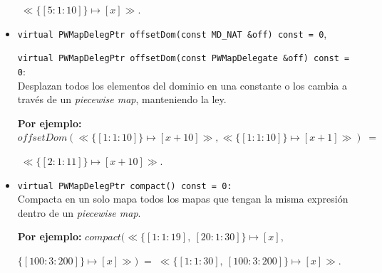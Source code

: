 \begin{itemize}
\begin{center}
        $\;\ll\{[5:1:10]\} \mapsto [x] \gg.$
    \end{center}
        

    \item \texttt{virtual PWMapDelegPtr offsetDom(const MD\_NAT \&off) const = 0}, \par \texttt{virtual PWMapDelegPtr offsetDom(const PWMapDelegate \&off) const = 0}:\\
    Desplazan todos los elementos del dominio en una constante o los cambia a través de un \textit{piecewise map}, manteniendo la ley.

        \begin{center}
        \textbf{Por ejemplo:} $offsetDom(\ll\{[1:1:10]\} \mapsto [x+10]\gg, \ll\{[1:1:10]\} \mapsto [x+1]\gg)\;=$
        
        $\;\ll\{[2:1:11]\} \mapsto [x+10] \gg.$
    \end{center}

    \item \texttt{virtual PWMapDelegPtr compact() const = 0:} \\
    Compacta en un solo mapa todos los mapas que tengan la misma expresión dentro de un \textit{piecewise map}.

    \begin{center}
        \textbf{Por ejemplo:} $compact(\ll\{[1:1:19],\ [20:1:30]\} \mapsto [x],\; $
        
        $\{[100:3:200]\} \mapsto [x]\gg)\;=\;\ll\{[1:1:30],\ [100:3:200]\} \mapsto [x]\gg.$
    \end{center}

\end{itemize}

